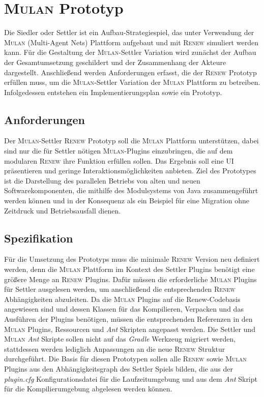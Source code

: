 \chapter{\textsc{Mulan} Prototyp} \label{cha:mulan_settler}
	Die Siedler oder Settler ist ein Aufbau-Strategiespiel, das unter Verwendung der \textsc{Mulan} (Multi-Agent Nets) Plattform aufgebaut und mit \textsc{Renew} simuliert werden kann. \bigbreak
	Für die Gestaltung der \textsc{Mulan}-Settler Variation wird zunächst der Aufbau der Gesamtumsetzung geschildert und der Zusammenhang der Akteure dargestellt. Anschließend werden Anforderungen erfasst, die der \textsc{Renew} Prototyp erfüllen muss, um die \textsc{Mulan}-Settler Variation der \textsc{Mulan} Plattform zu betreiben. Infolgedessen entstehen ein Implementierungsplan sowie ein Prototyp.

\section{Anforderungen} \label{sec:anforderungen2}
	Der \textsc{Mulan}-Settler \textsc{Renew} Prototyp soll die \textsc{Mulan} Plattform unterstützen, dabei sind nur die für Settler nötigen \textsc{Mulan}-Plugins einzubringen, die auf dem modularen \textsc{Renew} ihre Funktion erfüllen sollen. Das Ergebnis soll eine UI präsentieren und geringe Interaktionsmöglichkeiten anbieten. \newline 
	Ziel des Prototypes ist die Darstellung des parallelen Betriebs von alten und neuen Softwarekomponenten, die mithilfe des Modulsystems von Java zusammengeführt werden können und in der Konsequenz als ein Beispiel für eine Migration ohne  Zeitdruck und Betriebsausfall dienen.

\section{Spezifikation}
	Für die Umsetzung des Prototyps muss die minimale \textsc{Renew} Version neu definiert werden, denn die \textsc{Mulan} Plattform im Kontext des Settler Plugins benötigt eine größere Menge an \textsc{Renew} Plugins. Dafür müssen die erforderliche \textsc{Mulan} Plugins für Settler ausgelesen werden, um anschließend die entsprechenden \textsc{Renew} Abhängigkeiten abzuleiten. \newline
	Da die \textsc{Mulan} Plugins auf die Renew-Codebasis angewiesen sind und dessen Klassen für das Kompilieren, Verpacken und das Ausführen der Plugins benötigen, müssen die entsprechenden Referenzen in den \textsc{Mulan} Plugins, Ressourcen und \textit{Ant} Skripten angepasst werden. \newline
	Die Settler und \textsc{Mulan} \textit{Ant} Skripte sollen nicht auf das \textit{Gradle} Werkzeug migriert werden, stattdessen werden lediglich Anpassungen an die neue \textsc{Renew} Struktur durchgeführt. \bigbreak
	Die Basis für diesen Prototypen sollen alle \textsc{Renew} sowie \textsc{Mulan} Plugins aus den Abhängigkeitsgraph des Settler Spiels bilden, die aus der \textit{plugin.cfg} Konfigurationsdatei für die Laufzeitumgebung und aus dem \textit{Ant} Skript für die Kompilierumgebung abgelesen werden können. 


